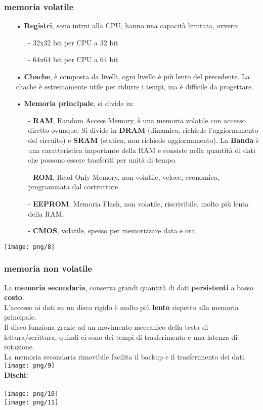 \documentclass[12pt, letterpaper]{article}
\begin{document}
\subsubsection{memoria volatile}
\begin{itemize}
   \item[•] \textbf{Registri}, sono intrni alla CPU, hanno una capacità limitata, ovvero: 
      \begin{itemize}
         \item[-] 32x32 bit per CPU a 32 bit
         \item[-] 64x64 bit per CPU a 64 bit
      \end{itemize}
   \item[•] \textbf{Chache}, è composta da livelli, ogni livello è più lento del precedente. La chache è estremamente utile per ridurre i tempi, ma è difficile da progettare.
   \item[•] \textbf{Memoria principale}, si divide in:
      \begin{itemize}
         \item[-] \textbf{RAM}, Random Access Memory, è una memoria volatile con accesso diretto ovunque. Si divide in \textbf{DRAM} (dinamica, richiede l'aggiornamento del circuito) e \textbf{SRAM} (statica, non richiede aggiornamento).
                  La \textbf{Banda} è una caratteristica importante della RAM e consiste nella quantità di dati che possono essere trasferiti per unità di tempo.
         \item[-] \textbf{ROM}, Read Only Memory, non volatile, veloce, economica, programmata dal costruttore.
         \item[-] \textbf{EEPROM}, Memoria Flash, non volatile, riscrivibile, molto più lenta della RAM.
         \item[-] \textbf{CMOS}, volatile, spesso per memorizzare data e ora.
      \end{itemize}
\end{itemize}
\texttt{[image: png/8]}

\subsubsection{memoria non volatile}

La \textbf{memoria secondaria}, conserva grandi quantità di dati \textbf{persistenti} a basso \textbf{costo}.
\\
L'accesso ai dati su un disco rigido è molto più \textbf{lento} rispetto alla memoria principale.
\\ Il disco funziona grazie ad un movimento meccanico della testa di lettura/scrittura, quindi ci sono dei tempi di trasferimento e una latenza di rotazione.
\\
La memoria secondaria rimovibile facilita il backup e il trasferimento dei dati.
\texttt{[image: png/9]}
\\
\textbf{Dischi:}
\\
\\
\texttt{[image: png/10]}\\
\texttt{[image: png/11]}
\end{document}
